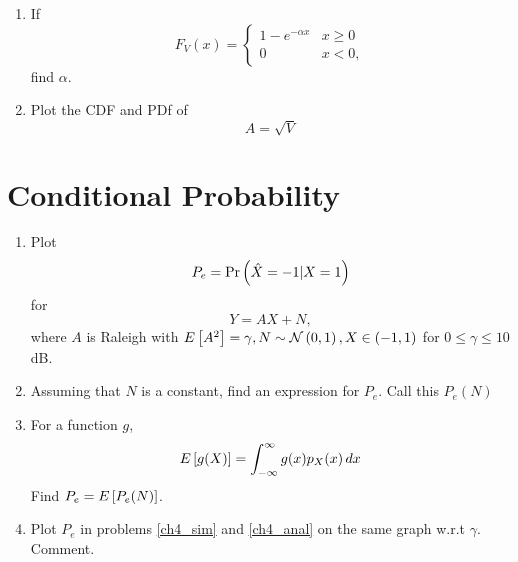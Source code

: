 \documentclass[journal,12pt,twocolumn]{IEEEtran}
\renewcommand\thesection{\arabic{section}}
\begin{document}
\begin{enumerate}[label=\thesection.\arabic*
,ref=\thesection.\theenumi]
\begin{align}
	\therefore p_R\brak{r} p_\Theta \brak{\theta} &= \frac{r}{2\pi}  \exp{\brak{-\frac{r^2}{2}}} \\
	\int_0^{2 \pi} p_R\brak{r} p_\Theta \brak{\theta} d\theta &= 
	\int_0^{2 \pi} \frac{r}{2\pi}  \exp{\brak{-\frac{r^2}{2}}} d\theta
\end{align}
We obtain PDF and CDF of R
\begin{align}
	p_R\brak{r} &= r \exp{\brak{-\frac{r^2}{2}}} & r\ge0 \\
	F_R\brak{r} &= \int_0^{r} t \exp{\brak{-\frac{t^2}{2}}} dt \\
	F_R\brak{r} &=  - \exp{\brak{-\frac{r^2}{2}}} + 1  
\end{align}
These lead to PDF and CDF of Y 
\begin{align}
	Y = R^2 \\
	R = \sqrt{Y} \\
	F_Y\brak{y} = F_R\brak{\sqrt{y}} \\
\end{align}
%
%
\item
If
%
\begin{equation}
F_{V}(x) = 
\begin{cases}
1 - e^{-\alpha x} & x \geq 0 \\
0 & x < 0,
\end{cases}
\end{equation}
%
find $\alpha$.
%
\item
\label{ch3_raleigh_sim}
Plot the CDF and PDf of
%
\begin{equation}
A = \sqrt{V}
\end{equation}
%
\end{enumerate}
\section{Conditional Probability}
\begin{enumerate}[label=\thesection.\arabic*
,ref=\thesection.\theenumi]
\item
\label{ch4_sim}
Plot 
\begin{equation}
P_e = \Pr\left(\hat{X} = -1|X=1\right)
\end{equation}
%
for 
\begin{equation}
Y = AX+N,
\end{equation}
where $A$ is Raleigh with $E{}\left[A^2\right] = \gamma, N \sim \mathcal{N}\left(0,1\right), X \in \left(-1,1\right)$ for $0 \le \gamma \le 10$ dB.
%
\item
Assuming that $N$ is a constant, find an expression for $P_e$.  Call this $P_e(N)$
%
\item
%
\label{ch4_anal}
For a function $g$,
\begin{equation}
E{}\left[g(X)\right] = \int_{-\infty}^{\infty}g(x)p_{X}(x)\, dx
\end{equation}
%
Find $P_e = E{}\left[P_e(N)\right]$.
%
\item
Plot $P_e$ in problems \ref{ch4_sim} and \ref{ch4_anal} on the same graph w.r.t $\gamma$.  Comment.
		\end{enumerate}
\end{document}
